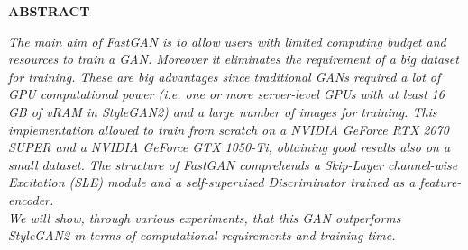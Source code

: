 \documentclass[12pt]{article}
\begin{document}
\begin{center}
	
	\normalsize\MakeUppercase{\textbf{Abstract}\vspace*{0.35cm}}
	
	\begin{minipage}[t]{0.6\textwidth}
	\textit{The main aim of FastGAN is to allow users with limited computing budget and resources to 
	train a GAN. Moreover it eliminates the requirement of a big dataset for training.
	These are big advantages since traditional GANs required a lot of GPU computational power
	(i.e. one or more server-level GPUs with at least 16 GB of vRAM in StyleGAN2) and a large number of 
	images for training. 
	This implementation allowed to train from scratch on a NVIDIA GeForce RTX 2070 SUPER and a 
	NVIDIA GeForce GTX 1050-Ti, obtaining good results also on a small dataset. 
	The structure of FastGAN comprehends a Skip-Layer channel-wise Excitation (SLE) module and a self-supervised
	Discriminator trained as a feature-encoder.\\
	We will show, through various experiments, that this GAN outperforms StyleGAN2 in terms of computational requirements
	and training time.
	}
	\end{minipage}

\end{center}

\vspace*{1cm}
\end{document}
